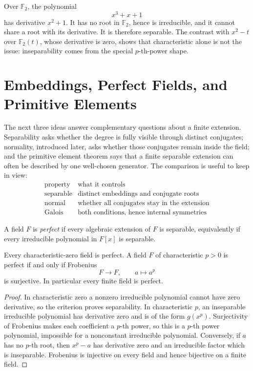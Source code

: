 \begin{example}\label{ex:sep-cubic}
Over \(\mathbb F_2\), the polynomial
\[
x^3+x+1
\]
has derivative \(x^2+1\).  It has no root in \(\mathbb F_2\), hence is
irreducible, and it cannot share a root with its derivative.  It is therefore
separable.  The contrast with \(x^2-t\) over \(\mathbb F_2(t)\), whose
derivative is zero, shows that characteristic alone is not the issue:
inseparability comes from the special \(p\)-th-power shape.
\end{example}

\section{Embeddings, Perfect Fields, and Primitive Elements}

The next three ideas answer complementary questions about a finite extension.
Separability asks whether the degree is fully visible through distinct
conjugates; normality, introduced later, asks whether those conjugates remain
inside the field; and the primitive element theorem says that a finite
separable extension can often be described by one well-chosen generator.
The comparison is useful to keep in view:
\[
\begin{array}{c|c}
\text{property} & \text{what it controls}\\ \hline
\text{separable} & \text{distinct embeddings and conjugate roots}\\
\text{normal} & \text{whether all conjugates stay in the extension}\\
\text{Galois} & \text{both conditions, hence internal symmetries}
\end{array}
\]

\begin{definition}
A field \(F\) is \emph{perfect} if every algebraic extension of \(F\) is
separable, equivalently if every irreducible polynomial in \(F[x]\) is
separable.
\end{definition}
\begin{proposition}
Every characteristic-zero field is perfect.  A field \(F\) of characteristic
\(p>0\) is perfect if and only if Frobenius
\[
F\longrightarrow F,\qquad a\longmapsto a^p
\]
is surjective.  In particular every finite field is perfect.
\end{proposition}
\begin{proof}
In characteristic zero a nonzero irreducible polynomial cannot have zero
derivative, so the criterion proves separability.  In characteristic \(p\),
an inseparable irreducible polynomial has derivative zero and is of the form
\(g(x^p)\).  Surjectivity of Frobenius makes each coefficient a \(p\)-th
power, so this is a \(p\)-th power polynomial, impossible for a nonconstant
irreducible polynomial.  Conversely, if \(a\) has no \(p\)-th root, then
\(x^p-a\) has derivative zero and an irreducible factor which is inseparable.
Frobenius is injective on every field and hence bijective on a finite field.
\end{proof}

